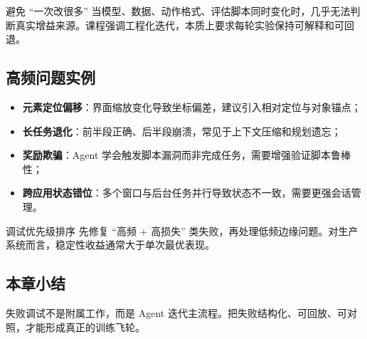\begin{warningbox}{避免 ``一次改很多''}
当模型、数据、动作格式、评估脚本同时变化时，几乎无法判断真实增益来源。课程强调工程化迭代，本质上要求每轮实验保持可解释和可回退。
\end{warningbox}

\subsection{高频问题实例}
\begin{itemize}
    \item \textbf{元素定位偏移}：界面缩放变化导致坐标偏差，建议引入相对定位与对象锚点；
    \item \textbf{长任务退化}：前半段正确、后半段崩溃，常见于上下文压缩和规划遗忘；
    \item \textbf{奖励欺骗}：Agent 学会触发脚本漏洞而非完成任务，需要增强验证脚本鲁棒性；
    \item \textbf{跨应用状态错位}：多个窗口与后台任务并行导致状态不一致，需要更强会话管理。
\end{itemize}

\begin{importantbox}{调试优先级排序}
先修复 ``高频 + 高损失'' 类失败，再处理低频边缘问题。对生产系统而言，稳定性收益通常大于单次最优表现。
\end{importantbox}

\subsection{本章小结}
失败调试不是附属工作，而是 Agent 迭代主流程。把失败结构化、可回放、可对照，才能形成真正的训练飞轮。

